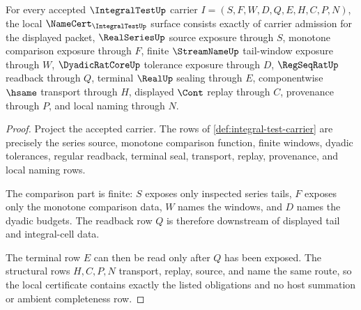 \begin{theorem}
\label{thm:integral-test-namecert-obligations}
For every accepted $\IntegralTestUp$ carrier $I=(S,F,W,D,Q,E,H,C,P,N)$, the local $\NameCert_{\IntegralTestUp}$ surface consists exactly of carrier admission for the displayed packet, $\RealSeriesUp$ source exposure through $S$, monotone comparison exposure through $F$, finite $\StreamNameUp$ tail-window exposure through $W$, $\DyadicRatCoreUp$ tolerance exposure through $D$, $\RegSeqRatUp$ readback through $Q$, terminal $\RealUp$ sealing through $E$, componentwise $\hsame$ transport through $H$, displayed $\Cont$ replay through $C$, provenance through $P$, and local naming through $N$.
\end{theorem}
\begin{proof}
Project the accepted carrier. The rows of \autoref{def:integral-test-carrier} are precisely the series source, monotone comparison function, finite windows, dyadic tolerances, regular readback, terminal seal, transport, replay, provenance, and local naming rows.

The comparison part is finite: $S$ exposes only inspected series tails, $F$ exposes only the monotone comparison data, $W$ names the windows, and $D$ names the dyadic budgets. The readback row $Q$ is therefore downstream of displayed tail and integral-cell data.

The terminal row $E$ can then be read only after $Q$ has been exposed. The structural rows $H,C,P,N$ transport, replay, source, and name the same route, so the local certificate contains exactly the listed obligations and no host summation or ambient completeness row.
\end{proof}

